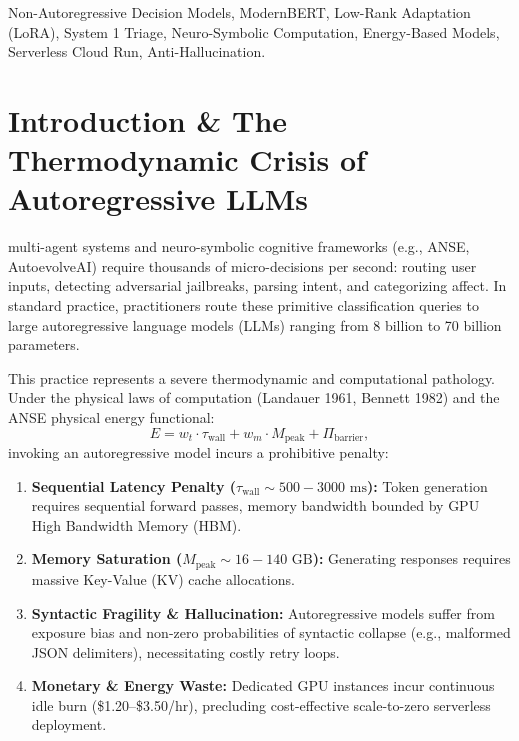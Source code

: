 \documentclass[10pt,journal,compsoc]{IEEEtran}
\theoremstyle{remark}
\begin{document}
{\begin{IEEEkeywords}
Non-Autoregressive Decision Models, ModernBERT, Low-Rank Adaptation (LoRA), System 1 Triage, Neuro-Symbolic Computation, Energy-Based Models, Serverless Cloud Run, Anti-Hallucination.
\end{IEEEkeywords}}

\maketitle
\IEEEdisplaynontitleabstractindextext
\IEEEpeerreviewmaketitle

\section{Introduction \& The Thermodynamic Crisis of Autoregressive LLMs}
 multi-agent systems and neuro-symbolic cognitive frameworks (e.g., ANSE, AutoevolveAI) require thousands of micro-decisions per second: routing user inputs, detecting adversarial jailbreaks, parsing intent, and categorizing affect. In standard practice, practitioners route these primitive classification queries to large autoregressive language models (LLMs) ranging from 8 billion to 70 billion parameters.

This practice represents a severe thermodynamic and computational pathology. Under the physical laws of computation (Landauer 1961, Bennett 1982) and the ANSE physical energy functional:
\begin{equation}
E = w_t \cdot \tau_{\text{wall}} + w_m \cdot M_{\text{peak}} + \Pi_{\text{barrier}},
\label{eq:anse_energy}
\end{equation}
invoking an autoregressive model incurs a prohibitive penalty:
\begin{enumerate}
    \item \textbf{Sequential Latency Penalty ($\tau_{\text{wall}} \sim 500 - 3000\text{ ms}$):} Token generation requires sequential forward passes, memory bandwidth bounded by GPU High Bandwidth Memory (HBM).
    \item \textbf{Memory Saturation ($M_{\text{peak}} \sim 16 - 140\text{ GB}$):} Generating responses requires massive Key-Value (KV) cache allocations.
    \item \textbf{Syntactic Fragility \& Hallucination:} Autoregressive models suffer from exposure bias and non-zero probabilities of syntactic collapse (e.g., malformed JSON delimiters), necessitating costly retry loops.
    \item \textbf{Monetary \& Energy Waste:} Dedicated GPU instances incur continuous idle burn (\$1.20--\$3.50/hr), precluding cost-effective scale-to-zero serverless deployment.
\end{enumerate}
\end{document}
